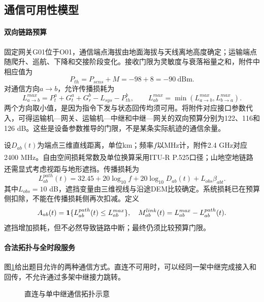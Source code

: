\subsection{通信可用性模型}
\paragraph{双向链路预算}
固定网关G01位于O01，通信端点海拔由地面海拔与天线离地高度确定；运输端点随爬升、巡航、下降和交接阶段变化。接收门限为灵敏度与衰落裕量之和，附件中相应值为
\begin{equation}P_{th}=P_{sens}+M=-98+8=-90\ \mathrm{dBm}.\end{equation}
对通信方向$a\to b$，允许传播损耗为
\begin{equation}
L_{a\to b}^{max}=P_t^a+G_t^a+G_r^b-L_{sys}-P_{th}^b,\qquad
L_{ab}^{max}=\min(L_{a\to b}^{max},L_{b\to a}^{max}).
\end{equation}
两个方向取小值，是因为指令下发与状态回传均须可用。将附件对应接口参数代入，可得运输机—网关、运输机—中继和中继—网关的双向预算分别为122、116和126 dB。这些是设备参数推导的门限，不是某条实际航迹的通信余量。

设$D_{ab}(t)$为端点三维直线距离，单位km；频率$f$以MHz计，附件2.4 GHz对应2400 MHz。自由空间损耗常数及单位换算采用ITU-R P.525口径\textsuperscript{\cite{ITUP525}}；山地空地链路还需显式考虑视距与地形遮挡\textsuperscript{\cite{Feng2006,Zeng2016}}。传播损耗为
\begin{equation}
L_{ab}^{path}(t)=32.45+20\log_{10}f+20\log_{10}D_{ab}(t)+L_{obs}\beta_{abt}.
\end{equation}
其中$L_{obs}=10$ dB，遮挡变量由三维视线与沿途DEM比较确定。系统损耗已在预算侧扣除，不能在传播损耗侧再次扣减。定义
\begin{equation}
A_{ab}(t)=\mathbf{1}\{L_{ab}^{path}(t)\le L_{ab}^{max}\},\quad
M_{ab}^{link}(t)=L_{ab}^{max}-L_{ab}^{path}(t).
\end{equation}
遮挡增加损耗，但不必然导致链路中断；最终仍须比较预算门限。

\paragraph{合法拓扑与全时段服务}
图\ref{fig:q3-topology}给出题目允许的两种通信方式。直连不可用时，可以经同一架中继完成接入和回传，不允许通过多架中继接力跳转。
\begin{figure}[htbp]\centering
{}
\caption{直连与单中继通信拓扑示意}\label{fig:q3-topology}
\end{figure}

